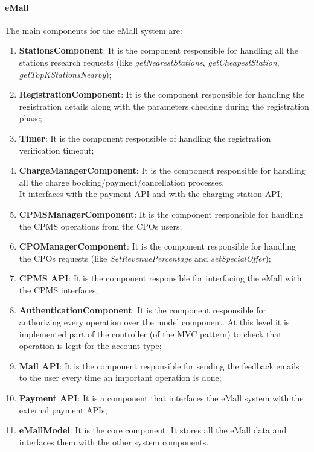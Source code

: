 \paragraph{\textbf{\ac{eMall}}}
The main components for the \ac{eMall} system are:
\begin{enumerate}[label=\textbf{eMall\arabic*}]
    \item \textbf{StationsComponent}: It is the component responsible for handling all the stations research requests (like \textit{getNearestStations}, \textit{getCheapestStation}, \textit{getTopKStationsNearby});\label{StationsComponent}
    \item \textbf{RegistrationComponent}: It is the component responsible for handling the registration details along with the parameters checking during the registration phase;\label{RegistrationComponent}
    \item \textbf{Timer}: It is the component responsible of handling the registration verification timeout;\label{Timer}
    \item \textbf{ChargeManagerComponent}: It is the component responsible for handling all the charge booking/payment/cancellation processes. \\ It interfaces with the payment \ac{API} and with the charging station \ac{API};\label{ChargeManagerComponent}
    \item \textbf{\ac{CPMS}ManagerComponent}: It is the component responsible for handling the \ac{CPMS} operations from the \acp{CPO} users;\label{CPMSManagerComponent}
    \item \textbf{\ac{CPO}ManagerComponent}: It is the component responsible for handling the \acp{CPO} requests (like \textit{SetRevenuePercentage} and \textit{setSpecialOffer});\label{CPOManagerComponent}
    \item \textbf{\ac{CPMS} \ac{API}}: It is the component responsible for interfacing the \ac{eMall} with the CPMS interfaces;\label{CPMSAPI}
    \item \textbf{AuthenticationComponent}: It is the component responsible for authorizing every operation over the model component. At this level it is implemented part of the controller (of the \ac{MVC} pattern) to check that operation is legit for the account type;\label{AuthenticationComponent}
    \item \textbf{Mail \ac{API}}: It is the component responsible for sending the feedback emails to the user every time an important operation is done;\label{MailAPI}
    \item \textbf{Payment \ac{API}}: It is a component that interfaces the \ac{eMall} system with the external payment \acp{API};\label{PaymentAPI}
    \item \textbf{\ac{eMall}Model}: It is the core component. It stores all the \ac{eMall} data and interfaces them with the other system components.\label{eMallModel}
\end{enumerate}
